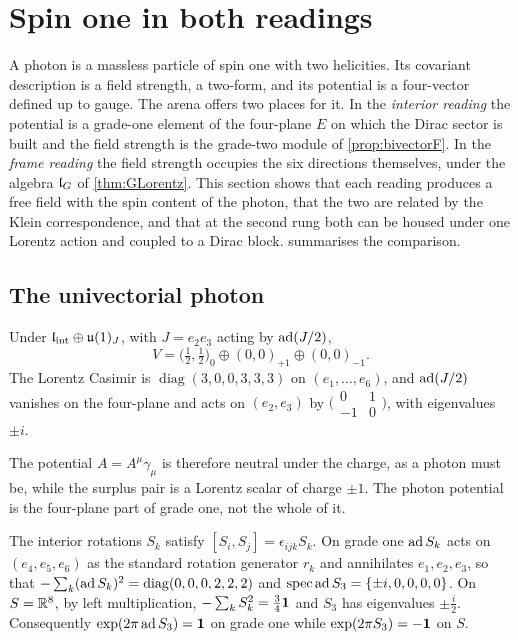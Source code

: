 \section{Spin one in both readings}
\label{sec:spin}

A photon is a massless particle of spin one with two helicities. Its covariant description is a field strength, a two-form, and
its potential is a four-vector defined up to gauge. The arena offers two places for it. In the \emph{interior reading} the
potential is a grade-one element of the four-plane $E$ on which the Dirac sector is built and the field strength is the grade-two
module of \cref{prop:bivectorF}. In the \emph{frame reading} the field strength occupies the six directions themselves, under the
algebra $\mathfrak l_G$ of \cref{thm:GLorentz}. This section shows that each reading produces a free field with the spin content of the photon,
that the two are related by the Klein correspondence, and that at the second rung both can be housed under one Lorentz action and
coupled to a Dirac block.  summarises the comparison.

\subsection{The univectorial photon}

\begin{proposition}
\label{prop:gradeone}
Under $\mathfrak l_{\rm int}\oplus\mathfrak{u}(1)_J$, with $J=e_2e_3$ acting by $\operatorname{ad}(J/2)$,
\[
V=\bigl(\tfrac12,\tfrac12\bigr)_0\oplus(0,0)_{+1}\oplus(0,0)_{-1}.
\]
The Lorentz Casimir is $\operatorname{diag}(3,0,0,3,3,3)$ on $(e_1,\dots,e_6)$, and $\operatorname{ad}(J/2)$ vanishes on the four-plane and acts on
$(e_2,e_3)$ by $\bigl(\begin{smallmatrix}0&1\\-1&0\end{smallmatrix}\bigr)$, with eigenvalues $\pm i$.
\end{proposition}

The potential $A=A^\mu\gamma_\mu$ is therefore neutral under the charge, as a photon must be, while the surplus pair is a Lorentz
scalar of charge $\pm1$. The photon potential is the four-plane part of grade one, not the whole of it.

\begin{proposition}
\label{prop:samerotors}
The interior rotations $S_k$ satisfy $[S_i,S_j]=\epsilon_{ijk}S_k$. On grade one $\operatorname{ad} S_k$ acts on $(e_4,e_5,e_6)$ as the standard
rotation generator $r_k$ and annihilates $e_1,e_2,e_3$, so that $-\sum_k(\operatorname{ad} S_k)^2=\operatorname{diag}(0,0,0,2,2,2)$ and
$\operatorname{spec}\operatorname{ad} S_3=\{\pm i,0,0,0,0\}$. On $S=\mathbb{R}^8$, by left multiplication, $-\sum_kS_k^2=\tfrac34\mathbf 1$ and $S_3$ has eigenvalues $\pm\tfrac i2$.
Consequently $\exp(2\pi\operatorname{ad} S_3)=\mathbf 1$ on grade one while $\exp(2\pi S_3)=-\mathbf 1$ on $S$.
\end{proposition}

